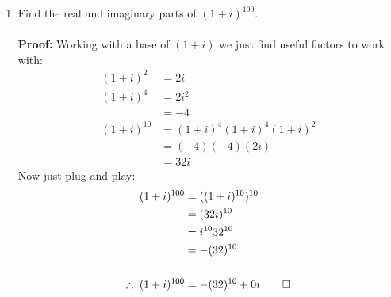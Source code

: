 \begin{enumerate}
	\item Find the real and imaginary parts of $(1 + i)^{100}.$ \\
	\\
	\textbf{Proof:}
	Working with a base of $(1 + i)$ we just find useful factors to work with:
	\begin{align*}
		(1 + i)^2 &= 2i \\
		(1 + i)^4 &= 2i^2 \\
		&= -4 \\
		(1 + i)^{10} &= (1 + i)^4(1 + i)^4(1 + i)^2 \\
		&= (-4)(-4)(2i) \\
		&= 32i
	\end{align*}
	Now just plug and play:
	\begin{align*}
		(1 + i)^{100} &= ((1 + i)^{10})^{10} \\
		&= (32i)^{10} \\
		&= i^{10}32^{10} \\
		&= -(32)^{10} \\
		\\
		\therefore \; (1 + i)^{100} &= -(32)^{10} +0i \qed
	\end{align*}
	

\end{enumerate}
